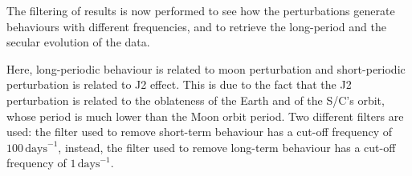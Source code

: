 The filtering of results is now performed to see how the perturbations generate behaviours with different frequencies, and to retrieve the long-period and the secular evolution of the data.


Here, long-periodic behaviour is related to moon perturbation and short-periodic perturbation is related to J2 effect. This is due to the fact that the J2 perturbation is related to the oblateness of the Earth and of the S/C’s orbit, whose period is much lower than the Moon orbit period. Two different filters are used: the filter used to remove short-term behaviour has a cut-off frequency of \(100 \, \text{days}^{-1}\), instead, the filter used to remove long-term behaviour has a cut-off frequency of \(1 \, \text{days}^{-1}\).